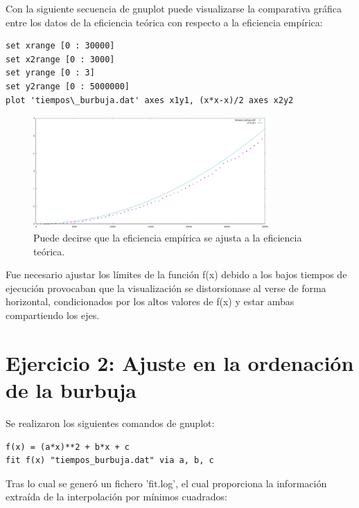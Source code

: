 \documentclass[paper=a4, fontsize=10pt]{scrartcl} %
\begin{document}
Con la siguiente secuencia de gnuplot puede visualizarse la comparativa gráfica entre los datos de la eficiencia teórica con respecto a la eficiencia empírica:

\begin{lstlisting}
set xrange [0 : 30000]
set x2range [0 : 3000]
set yrange [0 : 3]
set y2range [0 : 5000000]
plot 'tiempos\_burbuja.dat' axes x1y1, (x*x-x)/2 axes x2y2
\end{lstlisting}
\begin{figure}[H] %
	\centering
	\label{lsblk}
	\includegraphics[width=0.8\textwidth]{../imgs/c2.PNG}
	\caption{Puede decirse que la eficiencia empírica se ajusta a la eficiencia teórica.} 
\end{figure}

Fue necesario ajustar los límites de la función f(x) debido a los bajos tiempos de ejecución provocaban que la visualización se distorsionase al verse de forma horizontal, condicionados por los altos valores de f(x) y estar ambas compartiendo los ejes.

\section{ Ejercicio 2: Ajuste en la ordenación de la burbuja}

Se realizaron los siguientes comandos de gnuplot:

\begin{lstlisting}
f(x) = (a*x)**2 + b*x + c
fit f(x) "tiempos_burbuja.dat" via a, b, c
\end{lstlisting}

Tras lo cual se generó un fichero 'fit.log', el cual proporciona la información extraída de la interpolación por mínimos cuadrados:
\end{document}

